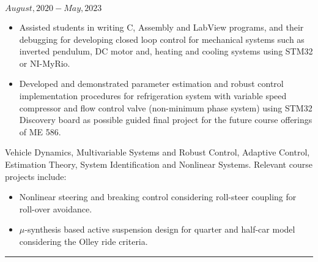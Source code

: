 \noindent {} \hfill $August, 2020 - May, 2023$
\begin{itemize}

        \item Assisted students in writing C, Assembly and LabView programs, and their debugging for developing closed loop control for mechanical systems such as inverted pendulum, DC motor and, heating and cooling systems using STM32 or NI-MyRio.

        \item {} Developed and demonstrated parameter estimation and robust control implementation procedures for refrigeration system with variable speed compressor and flow control valve (non-minimum phase system) using STM32 Discovery board as possible guided final project for the future course offerings of ME 586.
\end{itemize}
\medskip
 Vehicle Dynamics, Multivariable Systems and Robust Control, Adaptive Control, Estimation Theory, System Identification and Nonlinear Systems. Relevant course projects include:
\begin{itemize}
        \item Nonlinear steering and breaking control considering roll-steer coupling for roll-over avoidance.
        \item $\mu$-synthesis based active suspension design for quarter and half-car model considering the Olley ride criteria.
\end{itemize}

\noindent\rule{\textwidth}{0.4pt}
